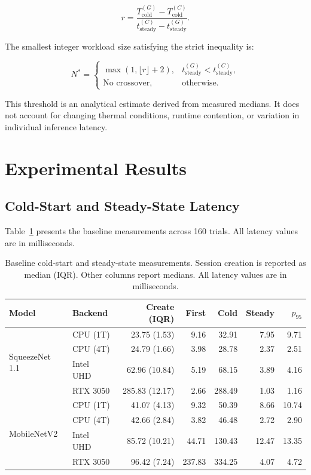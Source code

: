 \documentclass[pdflatex,sn-mathphys-num]{sn-jnl}
\begin{document}
\begin{equation}
r =
\frac{
T_{\mathrm{cold}}^{(G)}-T_{\mathrm{cold}}^{(C)}
}{
t_{\mathrm{steady}}^{(C)}-t_{\mathrm{steady}}^{(G)}
}.
\end{equation}

The smallest integer workload size satisfying the strict inequality is:

\begin{equation}
N^* =
\begin{cases}
\max(1,\lfloor r \rfloor+2),
&
t_{\mathrm{steady}}^{(G)}
<
t_{\mathrm{steady}}^{(C)},\\[6pt]
\text{No crossover},
&
\text{otherwise}.
\end{cases}
\end{equation}

This threshold is an analytical estimate derived from measured medians. It does not account for changing thermal conditions, runtime contention, or variation in individual inference latency.

\section{Experimental Results}

\subsection{Cold-Start and Steady-State Latency}

Table~\ref{tab:coldstart} presents the baseline measurements across 160 trials. All latency values are in milliseconds.

\begin{table}[ht]
\caption{Baseline cold-start and steady-state measurements. Session creation is reported as median (IQR). Other columns report medians. All latency values are in milliseconds.}
\label{tab:coldstart}
\centering
\small
\begin{tabular}{@{}llrrrrr@{}}
\toprule
Model & Backend & Create (IQR) & First & Cold & Steady & $p_{95}$ \\
\midrule
\multirow{4}{*}{SqueezeNet 1.1}
& CPU (1T) & 23.75 (1.53) & 9.16 & 32.91 & 7.95 & 9.71 \\
& CPU (4T) & 24.79 (1.66) & 3.98 & 28.78 & 2.37 & 2.51 \\
& Intel UHD & 62.96 (10.84) & 5.19 & 68.15 & 3.89 & 4.16 \\
& RTX 3050 & 285.83 (12.17) & 2.66 & 288.49 & 1.03 & 1.16 \\
\midrule
\multirow{4}{*}{MobileNetV2}
& CPU (1T) & 41.07 (4.13) & 9.32 & 50.39 & 8.66 & 10.74 \\
& CPU (4T) & 42.66 (2.84) & 3.82 & 46.48 & 2.72 & 2.90 \\
& Intel UHD & 85.72 (10.21) & 44.71 & 130.43 & 12.47 & 13.35 \\
& RTX 3050 & 96.42 (7.24) & 237.83 & 334.25 & 4.07 & 4.72 \\
\bottomrule
\end{tabular}
\end{table}
\end{document}
